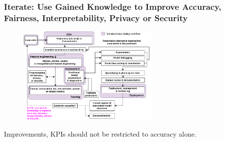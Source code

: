 \documentclass[11pt,
               aspectratio=169,
               hyperref={colorlinks}
               ]{beamer}
\begin{document}
		\begin{frame}	

			\frametitle{Iterate: Use Gained Knowledge to Improve Accuracy, Fairness, Interpretability, Privacy or Security}		
			
			\begin{figure}[htb]
				\begin{center}
					\includegraphics[height=135pt]{../img/iter.png}
					\label{fig:blueprint}
				\end{center}
			\end{figure}	

			\centering
			Improvements, KPIs should not be restricted to accuracy alone.
		
		\end{frame}




			

\end{document}

